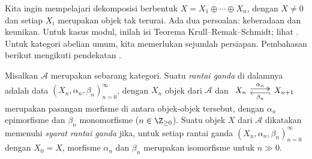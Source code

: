 Kita ingin mempelajari dekomposisi berbentuk
$X=X_1\oplus\cdots\oplus X_n$, dengan $X\neq 0$ dan setiap $X_i$ merupakan
objek tak terurai. Ada dua persoalan: keberadaan dan keunikan. Untuk kasus
modul, inilah isi Teorema Krull--Remak--Schmidt; lihat
\cite[Korolari 6.12.9]{Li1}. Untuk kategori abelian umum, kita memerlukan
sejumlah persiapan. Pembahasan berikut mengikuti pendekatan \cite{Kr15}.

\begin{definisi}\label{def:bichain}
	Misalkan $\mathcal{A}$ merupakan sebarang kategori. Suatu \emph{rantai
	ganda} di dalamnya adalah data $(X_n,\alpha_n,\beta_n)_{n=0}^\infty$,
	dengan $X_n$ objek dari $\mathcal{A}$ dan
	$\begin{tikzcd}
		X_n \arrow[twoheadrightarrow, r, shift left, "\alpha_n"] & X_{n+1} \arrow[hookrightarrow, l, shift left, "\beta_n"]
	\end{tikzcd}$
	merupakan pasangan morfisme di antara objek-objek tersebut, dengan
	$\alpha_n$ epimorfisme dan $\beta_n$
	monomorfisme ($n\in\Z_{\geq 0}$). Suatu objek $X$ dari $\mathcal{A}$
	dikatakan memenuhi \emph{syarat rantai ganda} jika, untuk setiap rantai
	ganda $(X_n,\alpha_n,\beta_n)_{n=0}^\infty$ dengan $X_0=X$, morfisme
	$\alpha_n$ dan $\beta_n$ merupakan isomorfisme untuk $n\gg 0$.
\end{definisi}

